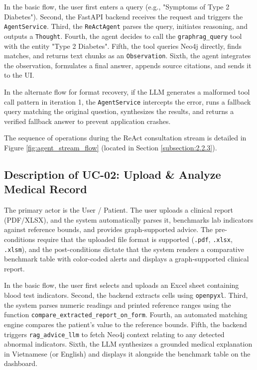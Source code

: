 \documentclass[../main.tex]{subfiles}
\begin{document}
In the basic flow, the user first enters a query (e.g., "Symptoms of Type 2 Diabetes"). Second, the FastAPI backend receives the request and triggers the \texttt{AgentService}. Third, the \texttt{ReActAgent} parses the query, initiates reasoning, and outputs a \texttt{Thought}. Fourth, the agent decides to call the \texttt{graphrag\_query} tool with the entity "Type 2 Diabetes". Fifth, the tool queries Neo4j directly, finds matches, and returns text chunks as an \texttt{Observation}. Sixth, the agent integrates the observation, formulates a final answer, appends source citations, and sends it to the UI.

In the alternate flow for format recovery, if the LLM generates a malformed tool call pattern in iteration 1, the \texttt{AgentService} intercepts the error, runs a fallback query matching the original question, synthesizes the results, and returns a verified fallback answer to prevent application crashes.

The sequence of operations during the ReAct consultation stream is detailed in Figure \ref{fig:agent_stream_flow} (located in Section \ref{subsection:2.2.3}).

\subsection{Description of UC-02: Upload \& Analyze Medical Record}
The primary actor is the User / Patient. The user uploads a clinical report (PDF/XLSX), and the system automatically parses it, benchmarks lab indicators against reference bounds, and provides graph-supported advice. The pre-conditions require that the uploaded file format is supported (\texttt{.pdf}, \texttt{.xlsx}, \texttt{.xlsm}), and the post-conditions dictate that the system renders a comparative benchmark table with color-coded alerts and displays a graph-supported clinical report.

In the basic flow, the user first selects and uploads an Excel sheet containing blood test indicators. Second, the backend extracts cells using \texttt{openpyxl}. Third, the system parses numeric readings and printed reference ranges using the function \nolinkurl{compare\_extracted\_report\_on\_form}. Fourth, an automated matching engine compares the patient's value to the reference bounds. Fifth, the backend triggers \texttt{rag\_advice\_llm} to fetch Neo4j context relating to any detected abnormal indicators. Sixth, the LLM synthesizes a grounded medical explanation in Vietnamese (or English) and displays it alongside the benchmark table on the dashboard.
\end{document}

